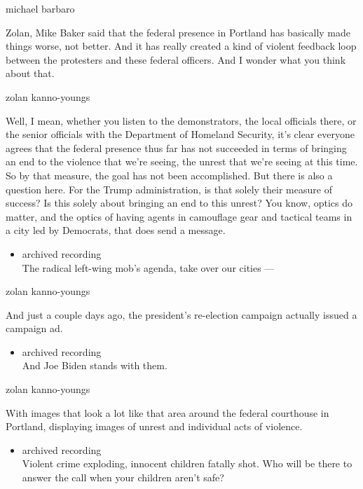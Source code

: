 michael barbaro

Zolan, Mike Baker said that the federal presence in Portland has
basically made things worse, not better. And it has really created a
kind of violent feedback loop between the protesters and these federal
officers. And I wonder what you think about that.

zolan kanno-youngs

Well, I mean, whether you listen to the demonstrators, the local
officials there, or the senior officials with the Department of Homeland
Security, it's clear everyone agrees that the federal presence thus far
has not succeeded in terms of bringing an end to the violence that we're
seeing, the unrest that we're seeing at this time. So by that measure,
the goal has not been accomplished. But there is also a question here.
For the Trump administration, is that solely their measure of success?
Is this solely about bringing an end to this unrest? You know, optics do
matter, and the optics of having agents in camouflage gear and tactical
teams in a city led by Democrats, that does send a message.

\begin{itemize}
\tightlist
\item
  archived recording\\
  The radical left-wing mob's agenda, take over our cities ---
\end{itemize}

zolan kanno-youngs

And just a couple days ago, the president's re-election campaign
actually issued a campaign ad.

\begin{itemize}
\tightlist
\item
  archived recording\\
  And Joe Biden stands with them.
\end{itemize}

zolan kanno-youngs

With images that look a lot like that area around the federal courthouse
in Portland, displaying images of unrest and individual acts of
violence.

\begin{itemize}
\tightlist
\item
  archived recording\\
  Violent crime exploding, innocent children fatally shot. Who will be
  there to answer the call when your children aren't safe?
\end{itemize}

